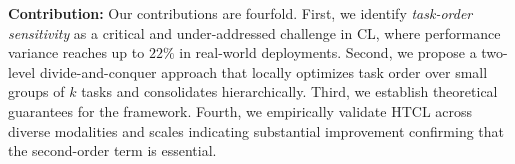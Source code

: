 \textbf{Contribution:} Our contributions are fourfold. First, we identify \emph{task-order sensitivity} as a critical and under-addressed challenge in CL, where performance variance reaches up to $22\%$ in real-world deployments. Second, we propose a two-level divide-and-conquer approach that locally optimizes task order over small groups of $k$ tasks and consolidates hierarchically. Third, we establish theoretical guarantees for the framework. Fourth, we empirically validate HTCL across diverse modalities and scales indicating substantial improvement confirming that the second-order term is essential.

 


